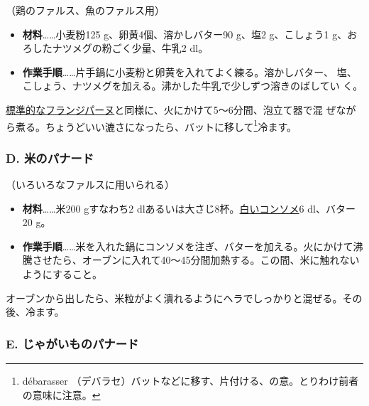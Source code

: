\begin{recette}
（鶏のファルス、魚のファルス用）

\begin{itemize}
\item
  \textbf{材料}\ldots{}\ldots{}小麦粉125 g、卵黄4個、溶かしバター90
  g、塩2 g、こしょう1 g、おろしたナツメグの粉ごく少量、牛乳2\undemi{}
  dl。
\item
  \textbf{作業手順}\ldots{}\ldots{}片手鍋に小麦粉と卵黄を入れてよく練る。溶かしバター、
  塩、こしょう、ナツメグを加える。沸かした牛乳で少しずつ溶きのばしてい
  く。
\end{itemize}

\protect\hyperlink{creme-frangipane}{標準的なフランジパーヌ}と同様に、火にかけて5〜6分間、泡立て器で混
ぜながら煮る。ちょうどいい漉さになったら、バットに移して\footnote{débarasser
  （デバラセ）バットなどに移す、片付ける、の意。とりわけ前者の意味に注意。}冷ます。

\maeaki

\hypertarget{panade-d}{%
\subsubsection{D. 米のパナード}\label{panade-d}}



（いろいろなファルスに用いられる）

\begin{itemize}
\item
  \textbf{材料}\ldots{}\ldots{}米200 gすなわち2
  dlあるいは大さじ8杯。\protect\hyperlink{}{白いコンソメ}6 dl、バター20
  g。
\item
  \textbf{作業手順}\ldots{}\ldots{}米を入れた鍋にコンソメを注ぎ、バターを加える。火にかけて沸騰させたら、オーブンに入れて40〜45分間加熱する。この間、米に触れないようにすること。
\end{itemize}

オーブンから出したら、米粒がよく潰れるようにヘラでしっかりと混ぜる。その後、冷ます。

\maeaki

\hypertarget{panade-e}{%
\subsubsection{E. じゃがいものパナード}\label{panade-e}}


\end{recette}
